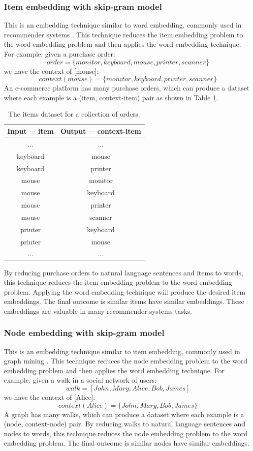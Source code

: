 \documentclass[conference]{IEEEtran}
\begin{document}
\subsubsection{Item embedding with skip-gram model}
This is an embedding technique similar to word embedding, commonly used in recommender systems \cite{barkan2016item2vec}.
This technique reduces the item embedding problem to the word embedding problem and then applies the word embedding technique.
For example, given a purchase order:
\[ order = \{monitor, keyboard, mouse, printer, scanner\} \]
we have the context of [mouse]:
\[ context(mouse) = \{monitor, keyboard, printer, scanner\} \]
An e-commerce platform has many purchase orders, which can produce a dataset where each example is a (item, context-item) pair as shown in Table \ref{tab:items}.
\begin{table}[!ht]
	\centering
	\caption{The items dataset for a collection of orders.}
	\begin{tabular}{cc} \hline \rowcolor{blue!30}
		Input = item & Output = context-item \\ \hline
		... & ...       \\ \hline
		keyboard & mouse \\ \hline
		keyboard & printer \\ \hline
		mouse & monitor \\ \hline
		mouse & keyboard \\ \hline
		mouse & printer \\ \hline
		mouse & scanner \\ \hline
		printer & keyboard \\ \hline
		printer & mouse \\ \hline
		... & ...       \\ \hline
	\end{tabular}
	\label{tab:items}
\end{table}
By reducing purchase orders to natural language sentences and items to words,
this technique reduces the item embedding problem to the word embedding problem.
Applying the word embedding technique will produce the desired item embeddings.
The final outcome is similar items have similar embeddings.
These embeddings are valuable in many recommender systems tasks.

\subsubsection{Node embedding with skip-gram model}
This is an embedding technique similar to item embedding, commonly used in
graph mining \cite{perozzi2014deepwalk} \cite{grover2016node2vec}.
This technique reduces the node embedding problem to the word embedding problem and then applies the word embedding technique.
For example, given a walk in a social network of users:
\[ walk = [John, Mary, Alice, Bob, James] \]
we have the context of [Alice]:
\[ context(Alice) = \{John, Mary, Bob, James\} \]
A graph has many walks, which can produce a dataset where each example is a (node, context-node) pair.
By reducing walks to natural language sentences and nodes to words,
this technique reduces the node embedding problem to the word embedding problem.
The final outcome is similar nodes have similar embeddings.
\end{document}
